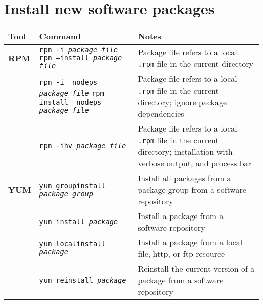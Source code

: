 \documentclass[10pt]{article}
\begin{document}
\cheatsheet


\section{Install new software packages}
\begin{tabular}{ p{3.5cm} p{9cm} p{11cm}}
  \hline
  \rowcolor{Gray}
  \textbf{Tool} & \textbf{Command} & \textbf{Notes} \\
  \hline 
  \textbf{RPM} & \texttt{rpm -i \textit{package file}} \newline \texttt{rpm --install \textit{package file}} & Package file refers  to a local \texttt{.rpm} file in the current directory\\
  \rowcolor{Gray}
  & \texttt{rpm -i --nodeps \textit{package file}} \newline \texttt{rpm --install --nodeps \textit{package file}} & Package file refers  to a local \texttt{.rpm} file in the current directory; ignore package dependencies\\
  & \texttt{rpm -ihv \textit{package file}} & Package file refers  to a local \texttt{.rpm} file in the current directory; installation with verbose output, and process bar\\
  \rowcolor{Gray}
  \textbf{YUM} & \texttt{yum groupinstall \textit{package group}} & Install all packages from a package group from a software repository\\
  & \texttt{yum install \textit{package}} & Install a package from a software repository\\
  \rowcolor{Gray}
  & \texttt{yum localinstall \textit{package}} & Install a package from a local file, http, or ftp resource\\
  & \texttt{yum reinstall \textit{package}} & Reinstall the current version of a package from a software repository\\
  \hline
\end{tabular}
\end{document}
